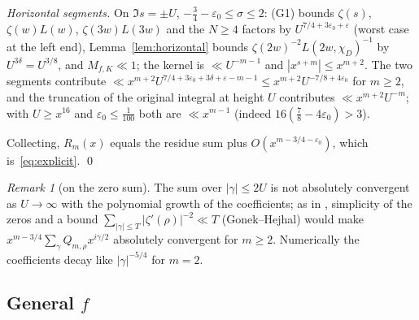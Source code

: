 \documentclass[11pt,a4paper]{article}
\theoremstyle{remark}\newtheorem{remark}[theorem]{Remark}
\begin{document}
\emph{Horizontal segments.} On $\Im s=\pm U$, $-\tfrac34-\varepsilon_0\le\sigma\le2$: (G1) bounds $\zeta(s)$,
$\zeta(w)L(w)$, $\zeta(3w)L(3w)$ and the $N\ge4$ factors by $U^{7/4+3\varepsilon_0+\varepsilon}$ (worst case at the left end),
Lemma~\ref{lem:horizontal} bounds $\zeta(2w)^{-2}L(2w,\chi_D)^{-1}$ by $U^{3\delta}=U^{3/8}$, and $M_{f,K}\ll1$; the kernel
is $\ll U^{-m-1}$ and $|x^{s+m}|\le x^{m+2}$. The two segments contribute
$\ll x^{m+2}U^{7/4+3\varepsilon_0+3\delta+\varepsilon-m-1}\le x^{m+2}U^{-7/8+4\varepsilon_0}$ for $m\ge2$, and the truncation of
the original integral at height $U$ contributes $\ll x^{m+2}U^{-m}$; with $U\ge x^{16}$ and $\varepsilon_0\le\tfrac1{100}$
both are $\ll x^{m-1}$ (indeed $16(\tfrac78-4\varepsilon_0)>3$).

Collecting, $R_m(x)$ equals the residue sum plus $O(x^{m-3/4-\varepsilon_0})$, which is~\eqref{eq:explicit}. \qed

\begin{remark}[on the zero sum]
The sum over $|\gamma|\le2U$ is not absolutely convergent as $U\to\infty$ with the polynomial growth of the
coefficients; as in \cite[Theorem~3]{GoldstonSuriajaya2021}, simplicity of the zeros and a bound
$\sum_{|\gamma|\le T}|\zeta'(\rho)|^{-2}\ll T$ (Gonek--Hejhal) would make $x^{m-3/4}\sum_\gamma Q_{m,\rho}x^{i\gamma/2}$
absolutely convergent for $m\ge2$. Numerically the coefficients decay like $|\gamma|^{-5/4}$ for $m=2$.
\end{remark}

\subsection{General $f$}
\end{document}
